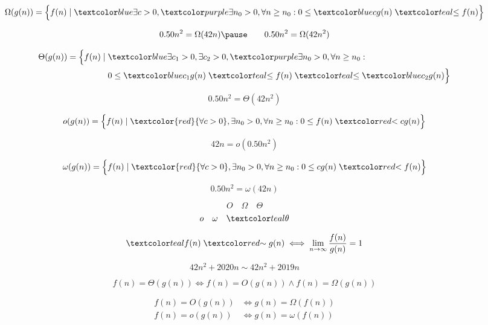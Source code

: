 \begin{frame}{}
  \[
    \Omega(g(n)) = \Big\{f(n) \mid \blue{\exists c > 0}, 
    \purple{\exists n_0 > 0, \forall n \ge n_0}: 
    0 \le \blue{c g(n)} \;\teal{\le}\; f(n) \Big\}
  \]

  \pause
  \[
    0.50 n^2 = \Omega(42 n) \pause \qquad 0.50 n^2 = \Omega(42n^2)
  \]

  \pause
  \begin{align*}
    \Theta(g(n)) = \Big\{f(n) \mid\; &\blue{\exists c_1 > 0, \exists c_2 > 0}, \purple{\exists n_0 > 0, \forall n \ge n_0}: \\ 
    & 0 \le \blue{c_1 g(n)} \;\teal{\le}\; f(n) \;\teal{\le}\; \blue{c_2 g(n)} \Big\}
  \end{align*}

  \pause
  \[
    0.50 n^2 = \Theta(42n^2)
  \]
\end{frame}

\begin{frame}{}
  \[
	o(g(n)) = \Big\{f(n) \mid \textcolor{red}{\forall c > 0}, \exists n_0 > 0, \forall n \ge n_0: 0 \le f(n) \;\red{<}\; c g(n)\Big\}
  \]

  \pause
  \[
    42n = o(0.50 n^2)
  \]

  \[
	\omega(g(n)) = \Big\{f(n) \mid \textcolor{red}{\forall c > 0}, \exists n_0 > 0, \forall n \ge n_0: 0 \le c g(n) \;\red{<}\; f(n)\Big\}
  \]

  \pause
  \[
    0.50 n^2 = \omega(42n)
  \]
\end{frame}

\begin{frame}{}
  \[
    O \quad \Omega \quad \Theta
  \]
  \[
    o \quad \omega \quad \teal{\theta}
  \]

  \pause
  \vspace{0.60cm}
  \[
	\teal{f(n) \;\red{\sim}\; g(n) \iff \lim_{n \to \infty} \frac{f(n)}{g(n)} = 1}
  \]

  \pause
  \vspace{0.60cm}
  \[
    42 n^2 + 2020 n \sim 42 n^2 + 2019 n
  \]
\end{frame}

\begin{frame}{}
  \[
    f(n) = \Theta(g(n)) \iff f(n) = O(g(n)) \land f(n) = \Omega(g(n))
  \]

  \begin{align*}
    f(n) = O(g(n)) &\iff g(n) = \Omega(f(n)) \\[6pt]
    f(n) = o(g(n)) &\iff g(n) = \omega(f(n))
  \end{align*}
\end{frame}

